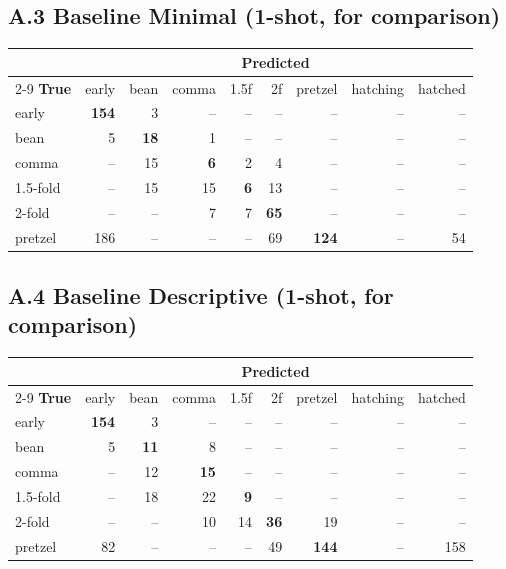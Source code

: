 \documentclass[11pt, a4paper]{article}
\begin{document}
\subsection*{A.3 Baseline Minimal (1-shot, for comparison)}

\begin{center}
\small
\begin{tabular}{@{}l*{8}{r}@{}}
\toprule
& \multicolumn{8}{c}{\textbf{Predicted}} \\
\cmidrule(l){2-9}
\textbf{True} & early & bean & comma & 1.5f & 2f & pretzel & hatching & hatched \\
\midrule
early    & \textbf{154} & 3 & -- & -- & -- & -- & -- & -- \\
bean     & 5 & \textbf{18} & 1 & -- & -- & -- & -- & -- \\
comma    & -- & 15 & \textbf{6} & 2 & 4 & -- & -- & -- \\
1.5-fold & -- & 15 & 15 & \textbf{6} & 13 & -- & -- & -- \\
2-fold   & -- & -- & 7 & 7 & \textbf{65} & -- & -- & -- \\
pretzel  & 186 & -- & -- & -- & 69 & \textbf{124} & -- & 54 \\
\bottomrule
\end{tabular}
\end{center}

\subsection*{A.4 Baseline Descriptive (1-shot, for comparison)}

\begin{center}
\small
\begin{tabular}{@{}l*{8}{r}@{}}
\toprule
& \multicolumn{8}{c}{\textbf{Predicted}} \\
\cmidrule(l){2-9}
\textbf{True} & early & bean & comma & 1.5f & 2f & pretzel & hatching & hatched \\
\midrule
early    & \textbf{154} & 3 & -- & -- & -- & -- & -- & -- \\
bean     & 5 & \textbf{11} & 8 & -- & -- & -- & -- & -- \\
comma    & -- & 12 & \textbf{15} & -- & -- & -- & -- & -- \\
1.5-fold & -- & 18 & 22 & \textbf{9} & -- & -- & -- & -- \\
2-fold   & -- & -- & 10 & 14 & \textbf{36} & 19 & -- & -- \\
pretzel  & 82 & -- & -- & -- & 49 & \textbf{144} & -- & 158 \\
\bottomrule
\end{tabular}
\end{center}
\end{document}
